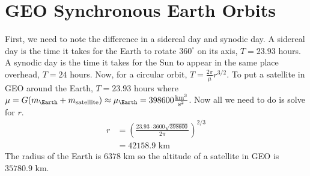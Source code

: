 \hypersetup{pageanchor = false}
\section{GEO Synchronous Earth Orbits}
\label{geo-synchr-earth}

First, we need to note the difference in a sidereal day and synodic day.
A sidereal day is the time it takes for the Earth to rotate \(360^{\circ}\) on
its axis, \(T = 23.93\) hours.
A synodic day is the time it takes for the Sun to appear in the same place
overhead, \(T = 24\) hours.
Now, for a circular orbit, \(T = \frac{2\pi}{\mu}r^{3/2}\).
To put a satellite in GEO around the Earth, \(T = 23.93\) hours where
\(\mu = G(m_{\Earth} + m_{\text{satellite}})\approx \mu_{\Earth} =
398600\frac{\text{km}^3}{\text{s}^2}\).
Now all we need to do is solve for \(r\).
\begin{align*} 
  r & = \left(\frac{23.93\cdot 3600\sqrt{398600}}{2\pi}\right)^{2/3}\\
    & = 42158.9\text{ km}
\end{align*}
The radius of the Earth is \(6378\) km so the altitude of a satellite in GEO
is \(35780.9\) km.
